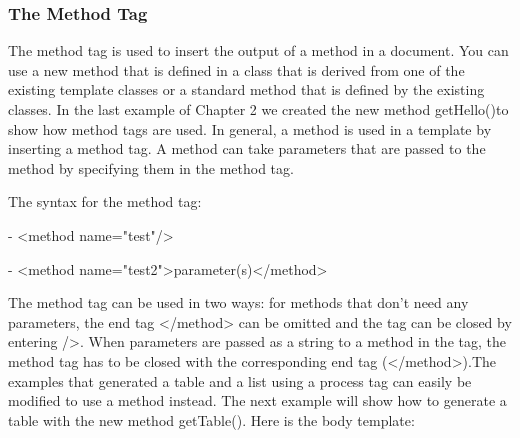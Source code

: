 \subsubsection{The Method Tag}
The method tag is used to insert the output of a method in a document.
You can use a new method that is defined in a class that is derived
from one of the existing template classes or a standard method that is
defined by the existing classes. In the last example of Chapter 2 we
created the new method {\meth getHello()}to show how method tags are used.
In general, a method is used in a template by inserting a method tag.
A method can take parameters that are passed to the method by
specifying them in the method tag.

The syntax for the method tag:

{\meth - <method name="test"/>

- <method name="test2">parameter(s)</method>}

The method tag can be used in two ways: for methods that don't need any
parameters, the end tag {\tag </method>} can be omitted and the tag can be
closed by entering {\tag />}. When parameters are passed as a string to a
method in the tag, the method tag has to be closed with the
corresponding end tag {\tag (</method>)}.The examples that generated a table
and a list using a process tag can easily be modified to use a method
instead. The next example will show how to generate a table with the
new method {\meth getTable()}. Here is the body template:

